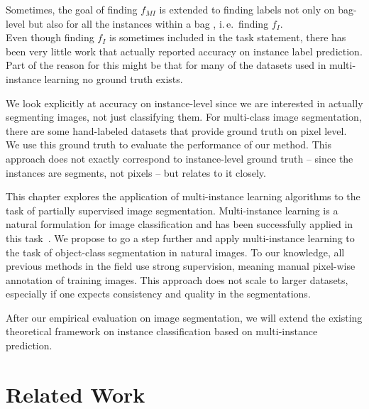Sometimes, the goal of finding $f_{MI}$ is extended to finding labels not only
on bag-level but also for all the instances within a bag
\citep{liconvex2010,zha2008joint}, i.\,e.\ finding $f_{I}$.\\ 
Even though finding $f_{I}$ is sometimes included in the task statement, there
has been very little work that actually reported accuracy on instance label prediction. Part
of the reason for this might be that for many of the datasets used in
multi-instance learning no ground truth exists.

We look explicitly at accuracy on instance-level since we are interested in
actually segmenting images, not just classifying them. For multi-class image
segmentation, there are some hand-labeled datasets that provide ground truth
on pixel level. We use this ground truth to evaluate the performance of our
method. This approach does not exactly correspond to instance-level ground truth --
since the instances are segments, not pixels -- but relates to it closely.


This chapter explores the 
application of multi-instance learning algorithms to the task of partially supervised image segmentation.
Multi-instance learning is a natural formulation for image classification and has been
successfully applied in this task~\citep{zhou2007multi}. We propose to go a step further and apply
multi-instance learning to the task of object-class segmentation in natural
images.
To our knowledge, all previous methods in the field use strong
supervision, meaning manual pixel-wise annotation of training images. This
approach does not scale to larger datasets, especially if one expects
consistency and quality in the segmentations.

After our empirical evaluation on image segmentation, we will extend the existing theoretical framework
on instance classification based on multi-instance prediction.

\section{Related Work}
